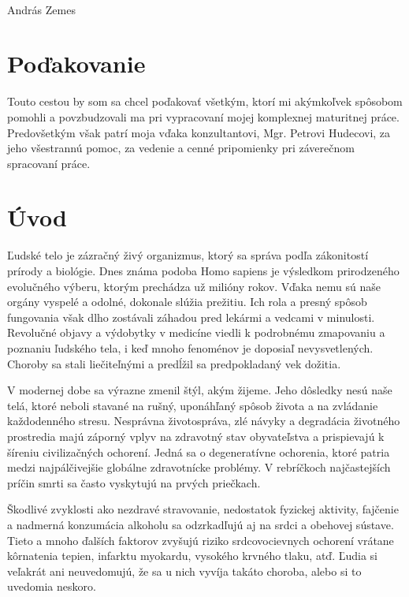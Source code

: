 \documentclass[titlepage,12pt]{article}
\begin{document}
\vspace{10mm}
\hrulefill
\\\hspace*{0mm}\phantom{v.r.: }András Zemes

\newpage
\vspace*{\fill}
\section*{Poďakovanie}
Touto cestou by som sa chcel poďakovať všetkým, ktorí mi akýmkoľvek spôsobom pomohli a povzbudzovali ma pri vypracovaní mojej komplexnej maturitnej práce. Predovšetkým však patrí moja vďaka konzultantovi, Mgr. Petrovi Hudecovi, za jeho všestrannú pomoc, za vedenie a cenné pripomienky pri záverečnom spracovaní práce.

\newpage
\tableofcontents


\newpage
{}
\setcounter{page}{7}
\section*{Úvod}

Ľudské telo je zázračný živý organizmus, ktorý sa správa podľa zákonitostí prírody a biológie. Dnes známa podoba Homo sapiens je výsledkom prirodzeného evolučného výberu, ktorým prechádza už milióny rokov. Vďaka nemu sú naše orgány vyspelé a odolné, dokonale slúžia prežitiu. Ich rola a presný spôsob fungovania však dlho zostávali záhadou pred lekármi a vedcami v minulosti. Revolučné objavy a výdobytky v medicíne viedli k podrobnému zmapovaniu \linebreak a poznaniu ľudského tela, i keď mnoho fenoménov je doposiaľ nevysvetlených. Choroby sa stali liečiteľnými a predĺžil sa predpokladaný vek dožitia.

V modernej dobe sa výrazne zmenil štýl, akým žijeme. Jeho dôsledky nesú naše telá, ktoré neboli stavané na rušný, uponáhľaný spôsob života a na zvládanie každodenného stresu. Nesprávna životospráva, zlé návyky a degradácia životného prostredia majú záporný vplyv na zdravotný stav obyvateľstva a prispievajú k šíreniu civilizačných ochorení. Jedná sa o degeneratívne ochorenia, ktoré patria medzi najpálčivejšie globálne zdravotnícke problémy. \linebreak V rebríčkoch najčastejších príčin smrti sa často vyskytujú na prvých priečkach.

Škodlivé zvyklosti ako nezdravé stravovanie, nedostatok fyzickej aktivity, fajčenie a nadmerná konzumácia alkoholu sa odzrkadľujú aj na srdci a obehovej sústave. Tieto a mnoho ďalších faktorov zvyšujú riziko srdcovocievnych ochorení vrátane kôrnatenia tepien, infarktu myokardu, vysokého krvného tlaku, atď. Ľudia si veľakrát ani neuvedomujú, že sa u nich vyvíja takáto choroba, alebo si to uvedomia neskoro.
\end{document}
